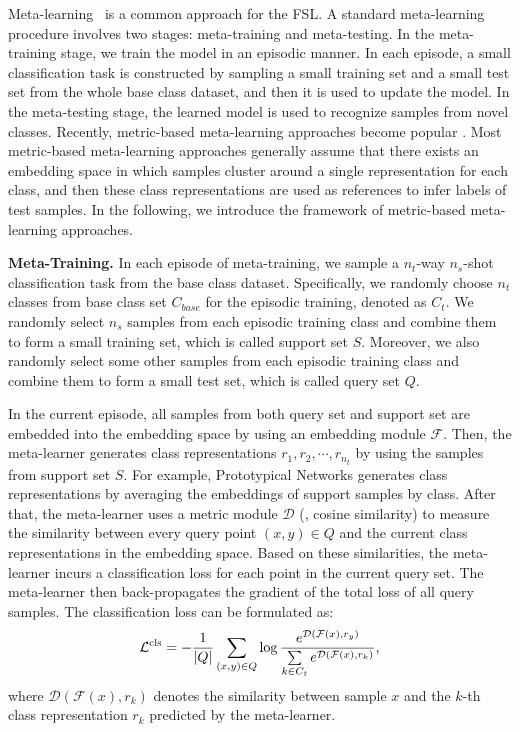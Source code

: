 \documentclass[10pt,twocolumn,letterpaper]{article}
\begin{document}
Meta-learning~\cite{Wang2018cvprlsl,Snell2017nips,vinyals2016bnips,Finn2017icml,Chen2019NIPS} is a common approach for the FSL.
A standard meta-learning procedure involves two stages: meta-training and meta-testing. 
In the meta-training stage, we train the model in an episodic manner. In each episode, a small classification task is constructed by sampling a small training set and a small test set from the whole base class dataset, and then it is used to update the model.
In the meta-testing stage, the learned model is used to recognize samples from novel classes.
Recently, metric-based meta-learning approaches become popular \cite{Chen2019NIPS,Gidaris2018cvpr}. 
Most metric-based meta-learning approaches generally assume that there exists an embedding space in which samples cluster around a single representation for each class, and
then these class representations are used as references to infer labels of test samples. In the following, we introduce the framework of metric-based meta-learning approaches.  
 

\noindent\textbf{Meta-Training.} 
In each episode of meta-training, we sample a $n_t$-way $n_s$-shot classification task from the base class dataset. Specifically, we randomly choose $n_t$ classes from base class set $C_{base}$ for the episodic training, denoted as $C_{t}$. We randomly select $n_s$ samples from each episodic training class and combine them to form a small training set, which is called support set $S$. Moreover, we also randomly select some other samples from each episodic training class and combine them to form a small test set, which is called query set $Q$.

In the current episode, all samples from both query set and support set are embedded into the embedding space by using an embedding module $\mathcal{F}$. Then, the meta-learner generates class representations $r_1, r_2, \cdots, r_{n_t}$ by using the samples from support set $S$. 
For example, Prototypical Networks \cite{Snell2017nips} generates class representations by averaging the embeddings of support samples by class. After that, the meta-learner uses a metric module $\mathcal{D}$ (\eg, cosine similarity) to measure the similarity between every query point $(x,y) \in Q$ and the current class representations in the embedding space. Based on these similarities, the meta-learner incurs a classification loss for each point in the current query set. The meta-learner then back-propagates the gradient of the total loss of all query samples. The classification loss can be formulated as:
\begin{equation}
\mathcal{L}^{\rm cls}=- \frac{1}{|Q|}\sum_{(x,y)\in Q}\log\frac{e^{\mathcal{D}(\mathcal{F}(x),r_y)}}{\sum\limits_{k\in C_{t}} e^{\mathcal{D}(\mathcal{F}(x),r_k)}},
\label{softmax}
\end{equation}
where $\mathcal{D}(\mathcal{F}(x),r_k)$ denotes the similarity between sample $x$ and the $k$-th class representation $r_k$ predicted by the meta-learner.
\end{document}
